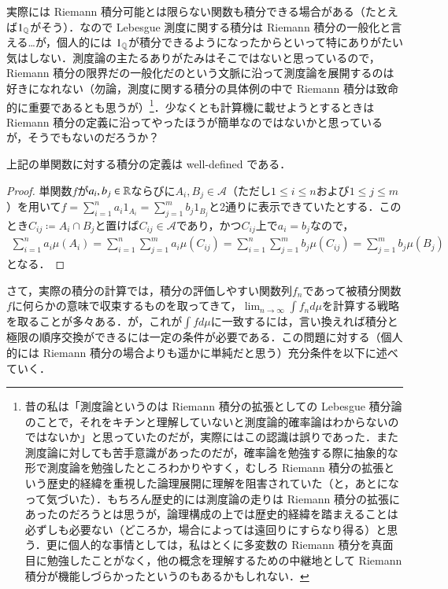 \begin{dig}
実際には Riemann 積分可能とは限らない関数も積分できる場合がある（たとえば$1_{\mathbb{Q}}$がそう）．なので Lebesgue 測度に関する積分は Riemann 積分の一般化と言える…が，個人的には $1_{\mathbb{Q}}$が積分できるようになったからといって特にありがたい気はしない．測度論の主たるありがたみはそこではないと思っているので，Riemann 積分の限界だの一般化だのという文脈に沿って測度論を展開するのは好きになれない（勿論，測度に関する積分の具体例の中で Riemann 積分は致命的に重要であるとも思うが）\footnote{昔の私は「測度論というのは Riemann 積分の拡張としての Lebesgue 積分論のことで，それをキチンと理解していないと測度論的確率論はわからないのではないか」と思っていたのだが，実際にはこの認識は誤りであった．また測度論に対しても苦手意識があったのだが，確率論を勉強する際に抽象的な形で測度論を勉強したところわかりやすく，むしろ Riemann 積分の拡張という歴史的経緯を重視した論理展開に理解を阻害されていた（と，あとになって気づいた）．もちろん歴史的には測度論の走りは Riemann 積分の拡張にあったのだろうとは思うが，論理構成の上では歴史的経緯を踏まえることは必ずしも必要ない（どころか，場合によっては遠回りにすらなり得る）と思う．更に個人的な事情としては，私はとくに多変数の Riemann 積分を真面目に勉強したことがなく，他の概念を理解するための中継地として Riemann 積分が機能しづらかったというのもあるかもしれない．}．少なくとも計算機に載せようとするときは Riemann 積分の定義に沿ってやったほうが簡単なのではないかと思っているが，そうでもないのだろうか？
\end{dig}

\begin{prop}
上記の単関数に対する積分の定義は well-defined である．
\end{prop}

\begin{proof}
単関数$f$が$a_i, b_j \in \mathbb{R}$ならびに$A_i, B_j \in \mathcal{A}$（ただし$1 \leq i \leq n$および$1 \leq j \leq m$）を用いて$f = \sum_{i=1}^n a_i 1_{A_i} = \sum_{j=1}^m b_j 1_{B_j}$と2通りに表示できていたとする．このとき$C_{ij} \coloneqq A_i \cap B_j$と置けば$C_{ij} \in \mathcal{A}$であり，かつ$C_{ij}$上で$a_i=b_j$なので，
\begin{align}
\sum_{i=1}^n a_i \mu(A_i) = \sum_{i=1}^n \sum_{j=1}^m a_i \mu(C_{ij}) = \sum_{i=1}^n \sum_{j=1}^m b_j \mu(C_{ij}) = \sum_{j=1}^m b_j \mu(B_j)
\end{align}となる．
\end{proof}

さて，実際の積分の計算では，積分の評価しやすい関数列$f_n$であって被積分関数$f$に何らかの意味で収束するものを取ってきて，$\lim_{n \to \infty}\int f_n d \mu$を計算する戦略を取ることが多々ある．が，これが$\int f d \mu$に一致するには，言い換えれば積分と極限の順序交換ができるには一定の条件が必要である．この問題に対する（個人的には Riemann 積分の場合よりも遥かに単純だと思う）充分条件を以下に述べていく．

